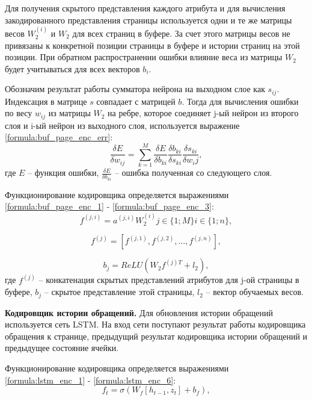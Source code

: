 Для получения скрытого представления каждого атрибута и для вычисления закодированного представления страницы используется одни и те же матрицы весов $W_2^{(i)}$ и $W_2$ для всех страниц в буфере.
За счет этого матрицы весов не привязаны к конкретной позиции страницы в буфере и истории страниц на этой позиции.
При обратном распространении ошибки влияние веса из матрицы $W_2$ будет учитываться для всех векторов $b_i$.

Обозначим результат работы сумматора нейрона на выходном слое как $s_{ij}$.
Индексация в матрице $s$ совпадает с матрицей $b$.
Тогда для вычисления ошибки по весу $w_{ij}$ из матрицы $W_2$ на ребре, которое соединяет j-ый нейрон из второго слоя и i-ый нейрон из выходного слоя, используется выражение \ref{formula:buf_page_enc_err}:
\begin{equation}\label{formula:buf_page_enc_err}
	\frac{\delta E}{\delta w_{ij}} = \sum\limits_{k=1}^{M}\frac{\delta E}{\delta b_{ki}}\frac{\delta b_{ki}}{\delta s_{ki}} \frac{\delta s_{ki}}{\delta w_ij},
\end{equation}
где $E$ -- функция ошибки, $\frac{\delta E}{\delta b_{ki}}$ -- ошибка полученная со следующего слоя.

Функционирование кодировщика определяется выражениями
\ref{formula:buf_page_enc_1} - \ref{formula:buf_page_enc_3}:
\begin{equation}\label{formula:buf_page_enc_1}
	f^{(j,i)} = a^{(j,i)}W_2^{(i)} j \in \{1;M\} i \in \{1;n\},
\end{equation}

\begin{equation}\label{formula:buf_page_enc_2}
	f^{(j)} = [f^{(j,1)}, f^{(j,2)}, ..., f^{(j,n)}],
\end{equation}

\begin{equation}\label{formula:buf_page_enc_3}
	b_j = ReLU(W_2f^{(j)T} + l_2),
\end{equation}
где $f^{(j)}$ -- конкатенация скрытых представлений атрибутов для j-ой страницы в буфере, $b_j$ -- скрытое представление этой страницы, $l_2$ -- вектор обучаемых весов.

\textbf{Кодировщик истории обращений.} Для обновления истории обращений используется сеть LSTM.
На вход сети поступают результат работы кодировщика обращения к странице, предыдущий результат кодировщика истории обращений и предыдущее состояние ячейки.

Функционирование кодировщика определяется выражениями
\ref{formula:lstm_enc_1} - \ref{formula:lstm_enc_6}:
\begin{equation}\label{formula:lstm_enc_1}
	f_t = \sigma(W_f[h_{t-1}, z_t] + b_f),
\end{equation}

